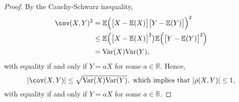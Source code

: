 \documentclass[lecture]{csm}
\newcommand{\R}{\mathbb{R}}
\newcommand{\expe}{\mathbb{E}}
\newcommand{\var}{\text{Var}}
\begin{document}
\begin{proof}
By the Cauchy-Schwarz inequality,
\begin{align*}
\cov(X,Y)^2
	& = \expe\Big(\big[X-\expe(X)\big]\big[Y-\expe(Y)\big]\Big)^2 \\
	& \leq \expe\Big(\big[X-\expe(X)\big]^2\big)\expe\Big(\big[Y-\expe(Y)\big]^2\Big) \\
	& = \var(X)\var(Y),
\end{align*}
with equality if and only if $Y=aX$ for some $a\in\R$. Hence,
\[
|\cov(X,Y)| \leq \sqrt{\var(X)\var(Y)},
\text{ which implies that }
|\rho(X,Y)|	\leq 1,
\]
with equality if and only if $Y=aX$ for some $a\in\R$. 
\end{proof}


\end{document}
